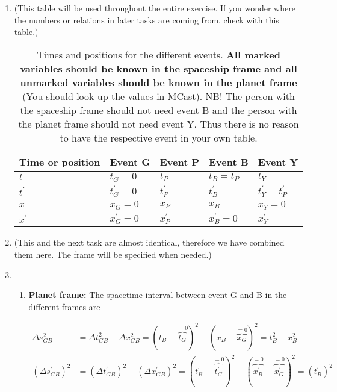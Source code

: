 \documentclass[a4paper,10pt,english]{article}
\begin{document}
\begin{enumerate}
\item (This table will be used throughout the entire exercise. If you wonder where the numbers or relations in later tasks are coming from, check with this table.)

\begin{table}[H]
  \begin{center}
    \begin{tabular}{| l | l | l | l | l |}
   	\hline
	 Time or position & Event G & Event P & Event B & Event Y\\ \hline
	 $t$ & $t_{G}=0$ & $t_{P}$ & $t_{B}=t_{P}$ & $t_{Y}$\\ \hline
	 $t^{\prime}$ & $t^{\prime}_{G}=0$ & $t_{P}^{\prime}$ & $t_{B}^{\prime}$ & $t^{\prime}_{Y}=t^{\prime}_{P}$\\ \hline
	 $x$ & $x_{G}=0$ & $x_{P}$ & $x_{B}$ & $x_{Y}=0$\\ \hline
	 $x^{\prime}$ & $x^{\prime}_{G}=0$ & $x_{P}^{\prime}$ & $x_{B}^{\prime}=0$ & $x^{\prime}_{Y}$\\ \hline
	\end{tabular}
    \caption{Times and positions for the different events. \textbf{All marked variables should be known in the spaceship frame and all unmarked variables should be known in the planet frame} (You should look up the values in MCast). NB! The person with the spaceship frame should not need event B and the person with the planet frame should not need event Y. Thus there is no reason to have the respective event in your own table.}
    \label{tabel:ex_2A_6}
  \end{center}
\end{table}
\FloatBarrier

\item (This and the next task are almost identical, therefore we have combined them here. The frame will be specified when needed.)
\item 
\begin{enumerate}
\item \underline{\bf{Planet frame:}} The spacetime interval between event G and B in the different frames are

\begin{align*}
\Delta s_{GB}^2&=\Delta t_{GB}^2-\Delta x_{GB}^2=(t_{B}-\overbrace{t_{G}}^{=0})^2-(x_{B}-\overbrace{x_{G}}^{=0})^2=t_{B}^2-x_{B}^2\\
(\Delta s_{GB}^{\prime})^2&=(\Delta t_{GB}^{\prime})^2-(\Delta x_{GB}^{\prime})^2=(t_{B}^{\prime}-\overbrace{t^{\prime}_{G}}^{=0})^2-(\overbrace{x_{B}^{\prime}}^{=0}-\overbrace{x^{\prime}_{G}}^{=0})^2=(t_{B}^{\prime})^2
\end{align*}


\end{enumerate}
\end{enumerate}
\end{document}
